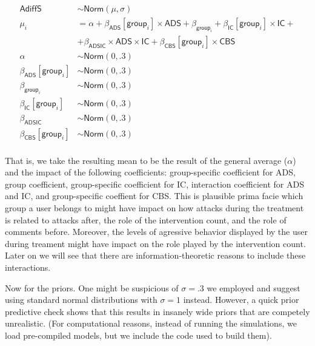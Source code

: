 \documentclass[
  10pt,
  dvipsnames,enabledeprecatedfontcommands]{scrartcl}
\begin{document}
\begin{align*}
\mathsf{AdiffS} & \sim \textsf{Norm}(\mu, \sigma)\\
\mu_i & = \alpha + \beta_{\mathsf{ADS}}[\mathsf{group}_i]\times \mathsf{ADS} + \beta_{\mathsf{group}_i}  +
 \beta_{\mathsf{IC}}[\mathsf{group}_i]\times \mathsf{IC} + \\
 & + \beta_{\mathsf{ADSIC}}\times \mathsf{ADS} \times \mathsf{IC} + \beta_{\mathsf{CBS}}[\mathsf{group}_i] \times \mathsf{CBS}\\
 \alpha & \sim \textsf{Norm}(0,.3)\\
\beta_{\mathsf{ADS}}[\mathsf{group}_i] & \sim \textsf{Norm}(0,.3)\\
\beta_{\mathsf{group}_i} & \sim \textsf{Norm}(0,.3)\\
\beta_{\mathsf{IC}}[\mathsf{group}_i] & \sim \textsf{Norm}(0,.3)\\
 \beta_{\mathsf{ADSIC}} & \sim \textsf{Norm}(0,.3)\\
 \beta_{\mathsf{CBS}}[\mathsf{group}_i]& \sim \textsf{Norm}(0,.3)\\
\end{align*}

That is, we take the resulting mean to be the result of the general
average (\(\alpha\)) and the impact of the following coefficients:
group-specific coefficient for \textsf{ADS}, group coefficient,
group-specific coefficient for \textsf{IC}, interaction coefficient for
\textsf{ADS} and \textsf{IC}, and group-specific coeffient for
\textsf{CBS}. This is plausible prima facie which group a user belongs
to might have impact on how attacks during the treatment is related to
attacks after, the role of the intervention count, and the role of
comments before. Moreover, the levels of agressive behavior displayed by
the user during treament might have impact on the role played by the
intervention count. Later on we will see that there are
information-theoretic reasons to include these interactions.

Now for the priors. One might be suspicious of \(\sigma =.3\) we
employed and suggest using standard normal distributions with
\(\sigma = 1\) instead. However, a quick prior predictive check shows
that this results in insanely wide priors that are competely
unrealistic. (For computational reasons, instead of running the
simulations, we load pre-compiled models, but we include the code used
to build them).

\vspace{1mm}
\footnotesize
\end{document}
